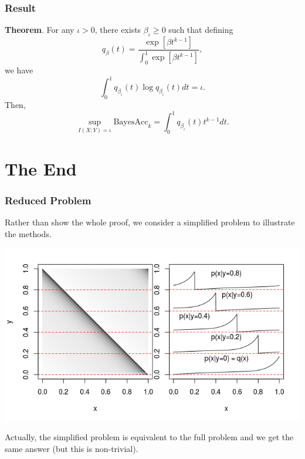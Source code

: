 \documentclass{beamer}
\begin{document}
\begin{frame}
\frametitle{Result}
\textbf{Theorem}.
For any $\iota > 0$, there exists $\beta_\iota \geq 0$ such that defining
\[
q_\beta(t) = \frac{\exp[\beta t^{k-1}]}{\int_0^1 \exp[\beta t^{k-1}]},
\]
we have
\[
\int_0^1 q_{\beta_\iota}(t) \log q_{\beta_\iota}(t) dt = \iota.
\]
Then,
\[
\sup_{I(X; Y) = \iota} \text{BayesAcc}_k = \int_0^1 q_{\beta_\iota}(t) t^{k-1} dt.
\]
\end{frame}

\section{The End}

\begin{frame}
\sectionpage
\end{frame}


\begin{frame}
\frametitle{Reduced Problem}
Rather than show the whole proof, we consider a simplified problem to illustrate the methods.
\begin{center}
\includegraphics[scale = 0.5]{../diagram/qxplot.png}
\end{center}

Actually, the simplified problem is equivalent to the full problem and we get the same answer (but this is non-trivial).
\end{frame}
\end{document}
